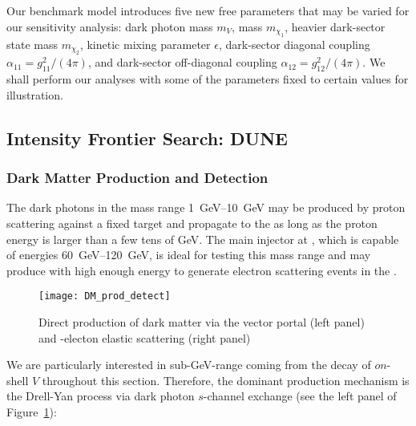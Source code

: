 Our benchmark model introduces five new free parameters that may be varied for our sensitivity analysis: dark photon mass $m_V$,  mass $m_{\chi_1}$, heavier dark-sector state mass $m_{\chi_2}$, kinetic mixing parameter $\epsilon$, dark-sector diagonal coupling $\alpha_{11} =g_{11}^2/(4\pi)$, and dark-sector off-diagonal coupling $\alpha_{12} =g_{12}^2/(4\pi)$. 
We shall perform our analyses with some of the parameters fixed to certain values for illustration.

\subsection{Intensity Frontier Search: DUNE  \label{sec:ND}}
\subsubsection{Dark Matter Production and Detection}
The dark photons in the mass range \SIrange{1}{10}{GeV} may be produced by proton scattering against a fixed target and propagate to the  as long as the proton energy is larger than a few tens of GeV. The main injector at \fnal, which is capable of energies \SIrange{60}{120}{GeV}, is ideal for testing this mass range  and may produce
 with high enough energy to generate electron scattering events in the . 
\begin{figure}[t]
\centering
\texttt{[image: DM\_prod\_detect]}
\caption[Direct production of  via the vector portal and -electon elastic scattering]{\label{fig:dm_prod} Direct production of dark matter via the vector portal (left panel) and -electon elastic scattering (right panel)}
\end{figure}
We are particularly interested in sub-GeV-range  coming from the decay of $on$-shell $V$ throughout this section. Therefore, the dominant production mechanism is the Drell-Yan process via dark photon $s$-channel exchange (see the left panel of Figure~\ref{fig:dm_prod}):

